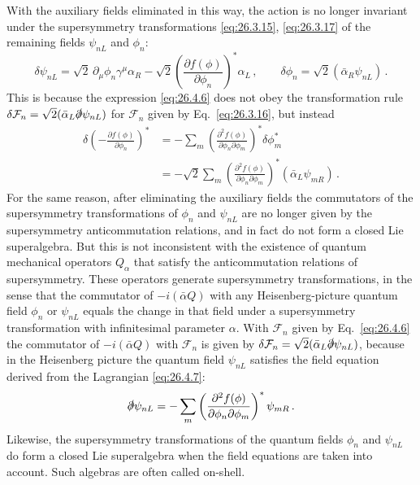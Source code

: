 With the auxiliary fields eliminated in this way, the action is no longer
invariant under the supersymmetry transformations \eqref{eq:26.3.15},
\eqref{eq:26.3.17} of the remaining fields \(\psi_{nL}\) and \(\phi_n\):
\[
  \delta\psi_{nL}
  =\sqrt2\,\partial_\mu\phi_n\gamma^\mu\alpha_R
  -\sqrt2\left(\frac{\partial f(\phi)}{\partial\phi_n}\right)^*\alpha_L\,,
  \qquad
  \delta\phi_n=\sqrt2(\bar\alpha_R\psi_{nL})\,.
\]
This is because the expression \eqref{eq:26.4.6} does not obey the
transformation rule
\(\delta\mathcal{F}_n=\sqrt2(\bar\alpha_L\sl{\partial}\psi_{nL})\) for
\(\mathcal{F}_n\) given by Eq.~\eqref{eq:26.3.16}, but instead
\[
  \begin{aligned}
  \delta\left(-\frac{\partial f(\phi)}{\partial\phi_n}\right)^*
  &=-\sum_m
    \left(\frac{\partial^2f(\phi)}
      {\partial\phi_n\partial\phi_m}\right)^*
    \delta\phi_m^*
  \\
  &=-\sqrt2\sum_m
    \left(\frac{\partial^2f(\phi)}
      {\partial\phi_n\partial\phi_m}\right)^*
    (\bar\alpha_L\psi_{mR})\,.
  \end{aligned}
\]
For the same reason, after eliminating the auxiliary fields the commutators of
the supersymmetry transformations of \(\phi_n\) and \(\psi_{nL}\) are no
longer given by the supersymmetry anticommutation relations, and in fact do
not form a closed Lie superalgebra. But this is not inconsistent with the
existence of quantum mechanical operators \(Q_\alpha\) that satisfy the
anticommutation relations of supersymmetry. These operators generate
supersymmetry transformations, in the sense that the commutator of
\(-i(\bar\alpha Q)\) with any Heisenberg-picture quantum field \(\phi_n\) or
\(\psi_{nL}\) equals the change in that field under a supersymmetry
transformation with infinitesimal parameter \(\alpha\). With
\(\mathcal{F}_n\) given by Eq.~\eqref{eq:26.4.6} the commutator of
\(-i(\bar\alpha Q)\) with \(\mathcal{F}_n\) is given by
\(\delta\mathcal{F}_n=\sqrt2(\bar\alpha_L\sl{\partial}\psi_{nL})\), because in
the Heisenberg picture the quantum field \(\psi_{nL}\) satisfies the field
equation derived from the Lagrangian \eqref{eq:26.4.7}:
\[
  \sl{\partial}\psi_{nL}
  =-\sum_m
    \left(\frac{\partial^2f(\phi)}
      {\partial\phi_n\partial\phi_m}\right)^*
    \psi_{mR}\,.
\]
Likewise, the supersymmetry transformations of the quantum fields \(\phi_n\)
and \(\psi_{nL}\) do form a closed Lie superalgebra when the field equations
are taken into account. Such algebras are often called on-shell.

